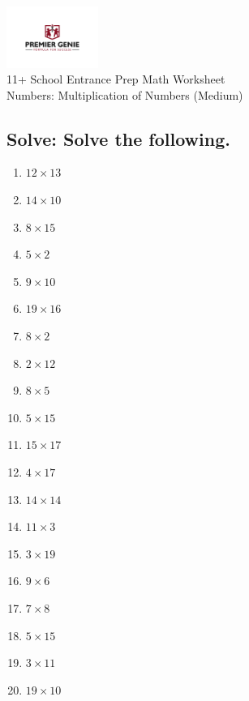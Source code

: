 \documentclass{article}
\begin{document}
\begin{center}
\includegraphics[width=3cm]{PREMGENIEJPG.jpg}\\
{\Large 11+ School Entrance Prep Math Worksheet}\\
{\Medium Numbers: Multiplication of Numbers (Medium)}\\

\end{center}

\subsection*{Solve: Solve the following.}

\begin{enumerate}
\item $\displaystyle {12}\times{13} $ \ 
\item $\displaystyle {14}\times{10} $ \ 
\item $\displaystyle {8}\times{15} $ \ 
\item $\displaystyle {5}\times{2} $ \ 
\item $\displaystyle {9}\times{10} $ \ 
\item $\displaystyle {19}\times{16} $ \ 
\item $\displaystyle {8}\times{2} $ \ 
\item $\displaystyle {2}\times{12} $ \ 
\item $\displaystyle {8}\times{5} $ \ 
\item $\displaystyle {5}\times{15} $ \ 
\item $\displaystyle {15}\times{17} $ \ 
\item $\displaystyle {4}\times{17} $ \ 
\item $\displaystyle {14}\times{14} $ \ 
\item $\displaystyle {11}\times{3} $ \ 
\item $\displaystyle {3}\times{19} $ \ 
\item $\displaystyle {9}\times{6} $ \ 
\item $\displaystyle {7}\times{8} $ \ 
\item $\displaystyle {5}\times{15} $ \ 
\item $\displaystyle {3}\times{11} $ \ 
\item $\displaystyle {19}\times{10} $ \ 


\end{enumerate}
\end{document}
